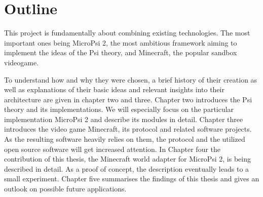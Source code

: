 \section{Outline}
This project is fundamentally about combining existing technologies. The most important ones being MicroPsi 2, the most ambitious framework aiming to implement the ideas of the Psi theory, and Minecraft, the popular sandbox videogame.

To understand how and why they were chosen, a brief history of their creation as well as explanations of their basic ideas and relevant insights into their architecture are given in chapter two and three. Chapter two introduces the Psi theory and its implementations. We will especially focus on the particular implementation MicroPsi 2 and describe its modules in detail. Chapter three introduces the video game Minecraft, its protocol and related software projects. As the resulting software heavily relies on them, the protocol and the utilized open source software will get increased attention. 
In Chapter four the contribution of this thesis, the Minecraft world adapter for MicroPsi 2, is being described in detail. As a proof of concept, the description eventually leads to a small experiment.
Chapter five summarises the findings of this thesis and gives an outlook on possible future applications.
